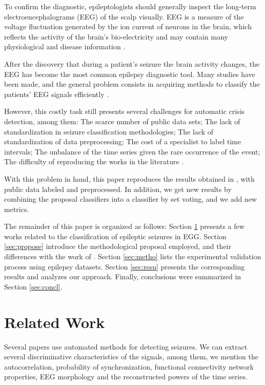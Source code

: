 To confirm the diagnostic, epileptologists should generally inspect the long-term electroencephalograms (EEG) of the scalp visually. EEG is a measure of the voltage fluctuation generated by the ion current of neurons in the brain, which reflects the activity of the brain’s bio-electricity and may contain many physiological and disease information \cite{niedermeyer2005electroencephalography}. 

After the discovery that during a patient's seizure the brain activity changes, the EEG has become the most common epilepsy diagnostic tool. Many studies have been made, and the general problem consists in acquiring methods to classify the patients' EEG signals efficiently \cite{puce2017review}. 

However, this costly task still presents several challenges for automatic crisis detection, among them: The scarce number of public data sets; The lack of standardization in seizure classification methodologies; The lack of standardization of data preprocessing; The cost of a specialist to label time intervals; The unbalance of the time series given the rare occurrence of the event; The difficulty of reproducing the works in the literature \cite{craik2019deep}.

With this problem in hand, this paper reproduces the results obtained in \cite{WenZha:2018}, with public data labeled and preprocessed. In addition, we get new results by combining the proposal classifiers into a classifier by set voting, and we add new metrics.

The remainder of this paper is organized as follows: Section \ref{sec:related} presents a few works related to the classification of epileptic seizures in EGG. Section \ref{sec:propose} introduce the methodological proposal employed, and their differences with the work of \cite{WenZha:2018}. Section \ref{sec:metho} lists the experimental validation process using epilepsy datasets. Section \ref{sec:resu} presents the corresponding results and analyzes our approach. Finally, conclusions were summarized in Section \ref{sec:concl}.


\section{Related Work}
\label{sec:related}

Several papers use automated methods for detecting seizures. We can extract several discriminative characteristics of the signals, among them, we mention the autocorrelation, probability of synchronization, functional connectivity network properties, EEG morphology and the reconstructed powers of the time series. 

